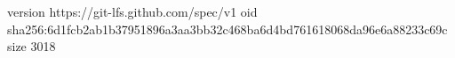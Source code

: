 version https://git-lfs.github.com/spec/v1
oid sha256:6d1fcb2ab1b37951896a3aa3bb32c468ba6d4bd761618068da96e6a88233c69c
size 3018
